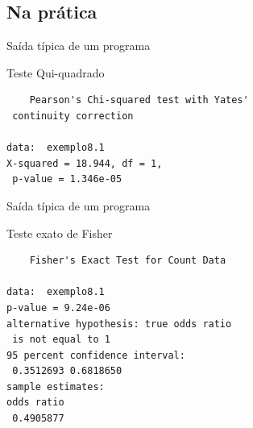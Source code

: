 \documentclass{beamer}
\begin{document}

\subsection{Na prática}


\begin{frame}[fragile]{Saída típica de um programa}
  \begin{block}{Teste Qui-quadrado}
    \footnotesize
\begin{verbatim}
	Pearson's Chi-squared test with Yates'
 continuity correction

data:  exemplo8.1
X-squared = 18.944, df = 1,
 p-value = 1.346e-05
\end{verbatim}
  \end{block}
\end{frame}

\begin{frame}[fragile]{Saída típica de um programa}
  \begin{block}{Teste exato de Fisher}
    \footnotesize
\begin{verbatim}
	Fisher's Exact Test for Count Data

data:  exemplo8.1
p-value = 9.24e-06
alternative hypothesis: true odds ratio
 is not equal to 1
95 percent confidence interval:
 0.3512693 0.6818650
sample estimates:
odds ratio
 0.4905877
\end{verbatim}
  \end{block}
\end{frame}
\end{document}
